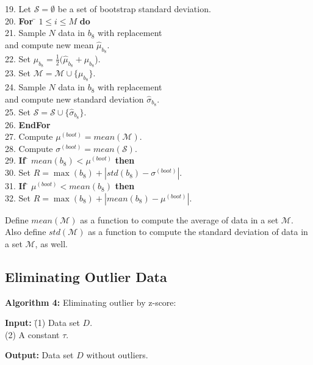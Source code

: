 \documentclass[a4paper,fleqn]{cas-dc}
\begin{document}
\begin{tabbing}
19.  \> Let $\mathcal{S} = \emptyset$ be a set of bootstrap standard deviation. \\
20.  \> {\bf For} \= $1 \leq i \leq M$ {\bf do} \\
21.  \>           \> Sample $N$ data in $b_{8}$ with replacement \\
     \>           \> and compute new mean $\hat{\mu}_{b_{8}}$. \\
22.  \>           \> Set $\mu_{b_{8}} = \frac{1}{2}(\hat{\mu}_{b_{8}} + \mu_{b_{8}}$). \\
23.  \>           \> Set $\mathcal{M} = \mathcal{M} \cup \{\mu_{b_{8}}\}$. \\
24.  \>           \> Sample $N$ data in $b_{8}$ with replacement \\
     \>           \> and compute new standard deviation $\hat{\sigma}_{b_{8}}$. \\
25.  \>           \> Set $\mathcal{S} = \mathcal{S} \cup \{\hat{\sigma}_{b_{8}}\}$. \\
26.  \> {\bf EndFor} \\
27.  \> Compute $\mu^{(boot)} = mean(\mathcal{M})$. \\
28.  \> Compute $\sigma^{(boot)} = mean(\mathcal{S})$. \\
29.  \> {\bf If} \= $mean(b_{8}) < \mu^{(boot)}$ {\bf then} \\
30.  \>          \> Set $R = \max(b_{8}) + |std(b_{8}) - \sigma^{(boot)}|$. \\
31.  \> {\bf If} \= $\mu^{(boot)} < mean(b_{8})$ {\bf then} \\
32.  \>          \> Set $R = \max(b_{8}) + |mean(b_{
8}) - \mu^{(boot)}|$. 
\end{tabbing}
Define $mean(\mathcal{M})$ as a function to compute the average of data in a set $\mathcal{M}$. Also define $std(\mathcal{M})$ as a function to compute the standard deviation of data in a set $\mathcal{M}$, as well.  

\subsection{Eliminating Outlier Data}
\noindent
{\bf Algorithm 4:} Eliminating outlier by z-score:

\begin{tabbing}
{\bf Input:} \= (1) Data set $D$. \\
             \> (2) A constant $\tau$.
\end{tabbing}

\noindent
{\bf Output:} Data set $D$ without outliers.
\end{document}

